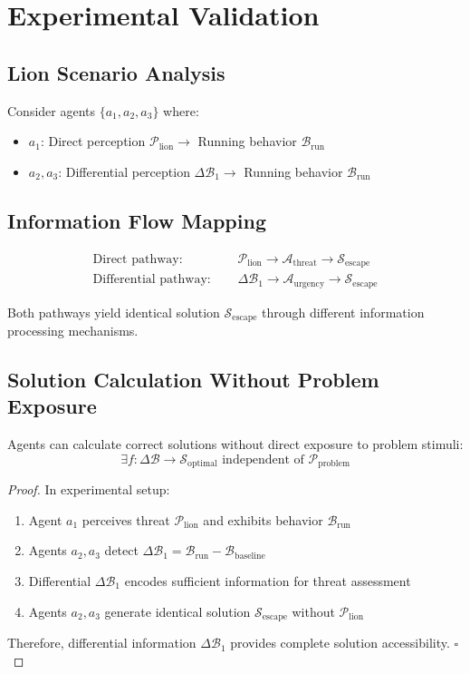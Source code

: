 \documentclass{article}
\begin{document}
\section{Experimental Validation}

\subsection{Lion Scenario Analysis}
Consider agents $\{a_1, a_2, a_3\}$ where:
\begin{itemize}
    \item $a_1$: Direct perception $\mathcal{P}_{\text{lion}} \rightarrow$ Running behavior $\mathcal{B}_{\text{run}}$
    \item $a_2, a_3$: Differential perception $\Delta \mathcal{B}_1 \rightarrow$ Running behavior $\mathcal{B}_{\text{run}}$
\end{itemize}

\subsection{Information Flow Mapping}
\begin{align}
\text{Direct pathway: } &\quad \mathcal{P}_{\text{lion}} \rightarrow \mathcal{A}_{\text{threat}} \rightarrow \mathcal{S}_{\text{escape}} \\
\text{Differential pathway: } &\quad \Delta \mathcal{B}_1 \rightarrow \mathcal{A}_{\text{urgency}} \rightarrow \mathcal{S}_{\text{escape}}
\end{align}

Both pathways yield identical solution $\mathcal{S}_{\text{escape}}$ through different information processing mechanisms.

\subsection{Solution Calculation Without Problem Exposure}
\begin{theorem}
Agents can calculate correct solutions without direct exposure to problem stimuli:
$$\exists f: \Delta \mathcal{B} \rightarrow \mathcal{S}_{\text{optimal}} \text{ independent of } \mathcal{P}_{\text{problem}}$$
\end{theorem}

\begin{proof}
In experimental setup:
\begin{enumerate}
    \item Agent $a_1$ perceives threat $\mathcal{P}_{\text{lion}}$ and exhibits behavior $\mathcal{B}_{\text{run}}$
    \item Agents $a_2, a_3$ detect $\Delta \mathcal{B}_1 = \mathcal{B}_{\text{run}} - \mathcal{B}_{\text{baseline}}$
    \item Differential $\Delta \mathcal{B}_1$ encodes sufficient information for threat assessment
    \item Agents $a_2, a_3$ generate identical solution $\mathcal{S}_{\text{escape}}$ without $\mathcal{P}_{\text{lion}}$
\end{enumerate}
Therefore, differential information $\Delta \mathcal{B}_1$ provides complete solution accessibility. $\square$
\end{proof}
\end{document}
